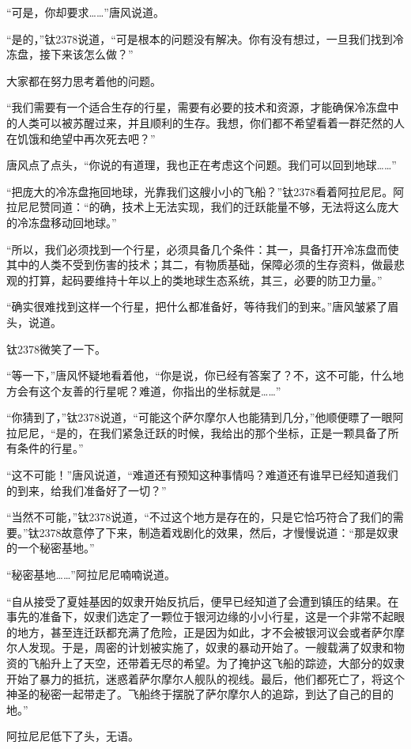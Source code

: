 “可是，你却要求……”唐风说道。 

“是的，”钛2378说道，“可是根本的问题没有解决。你有没有想过，一旦我们找到冷冻盘，接下来该怎么做？” 

大家都在努力思考着他的问题。 

“我们需要有一个适合生存的行星，需要有必要的技术和资源，才能确保冷冻盘中的人类可以被苏醒过来，并且顺利的生存。我想，你们都不希望看着一群茫然的人在饥饿和绝望中再次死去吧？” 

唐风点了点头，“你说的有道理，我也正在考虑这个问题。我们可以回到地球……” 

“把庞大的冷冻盘拖回地球，光靠我们这艘小小的飞船？”钛2378看着阿拉尼尼。阿拉尼尼赞同道：“的确，技术上无法实现，我们的迁跃能量不够，无法将这么庞大的冷冻盘移动回地球。” 

“所以，我们必须找到一个行星，必须具备几个条件：其一，具备打开冷冻盘而使其中的人类不受到伤害的技术；其二，有物质基础，保障必须的生存资料，做最悲观的打算，起码要维持十年以上的类地球生态系统，其三，必要的防卫力量。” 

“确实很难找到这样一个行星，把什么都准备好，等待我们的到来。”唐风皱紧了眉头，说道。 

钛2378微笑了一下。 

“等一下，”唐风怀疑地看着他，“你是说，你已经有答案了？不，这不可能，什么地方会有这个友善的行星呢？难道，你指出的坐标就是……” 

“你猜到了，”钛2378说道，“可能这个萨尔摩尔人也能猜到几分，”他顺便瞟了一眼阿拉尼尼，“是的，在我们紧急迁跃的时候，我给出的那个坐标，正是一颗具备了所有条件的行星。” 

“这不可能！”唐风说道，“难道还有预知这种事情吗？难道还有谁早已经知道我们的到来，给我们准备好了一切？” 

“当然不可能，”钛2378说道，“不过这个地方是存在的，只是它恰巧符合了我们的需要。”钛2378故意停了下来，制造着戏剧化的效果，然后，才慢慢说道：“那是奴隶的一个秘密基地。” 

“秘密基地……”阿拉尼尼喃喃说道。 

“自从接受了夏娃基因的奴隶开始反抗后，便早已经知道了会遭到镇压的结果。在事先的准备下，奴隶们选定了一颗位于银河边缘的小小行星，这是一个非常不起眼的地方，甚至连迁跃都充满了危险，正是因为如此，才不会被银河议会或者萨尔摩尔人发现。于是，周密的计划被实施了，奴隶的暴动开始了。一艘载满了奴隶和物资的飞船升上了天空，还带着无尽的希望。为了掩护这飞船的踪迹，大部分的奴隶开始了暴力的抵抗，迷惑着萨尔摩尔人舰队的视线。最后，他们都死亡了，将这个神圣的秘密一起带走了。飞船终于摆脱了萨尔摩尔人的追踪，到达了自己的目的地。” 

阿拉尼尼低下了头，无语。 

